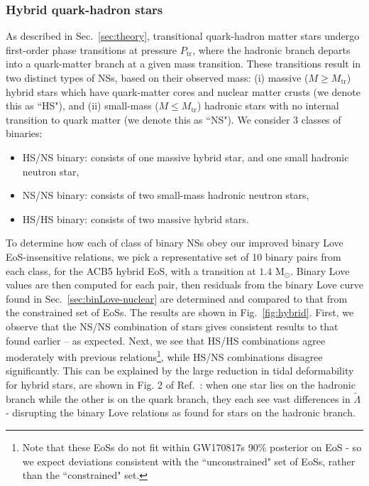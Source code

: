 \documentclass[prd,twocolumn,nofootinbib,superscriptaddress,amsmath,amssymb]{revtex4-1}
\begin{document}
\subsubsection{Hybrid quark-hadron stars}\label{sec:binLove-hybrid}
As described in Sec.~\ref{sec:theory}, transitional quark-hadron matter stars undergo first-order phase transitions at pressure $P_{\text{tr}}$, where the hadronic branch departs into a quark-matter branch at a given mass transition.
These transitions result in two distinct types of NSs, based on their observed mass: (i) massive ($M \geq M_{\text{tr}}$) hybrid stars which have quark-matter cores and nuclear matter crusts (we denote this as ``HS"), and (ii) small-mass ($M \leq M_{\text{tr}}$) hadronic stars with no internal transition to quark matter (we denote this as ``NS").
We consider 3 classes of binaries:
\begin{itemize}
\item HS/NS binary: consists of one massive hybrid star, and one small hadronic neutron star,
\item NS/NS binary: consists of two small-mass hadronic neutron stars,
\item HS/HS binary: consists of two massive hybrid stars.
\end{itemize}

To determine how each of class of binary NSs obey our improved binary Love EoS-insensitive relations, we pick a representative set of 10 binary pairs from each class, for the ACB5 hybrid EoS, with a transition at $1.4 \text{ M}_{\odot}$.
Binary Love values are then computed for each pair, then residuals from the binary Love curve found in Sec.~\ref{sec:binLove-nuclear} are determined and compared to that from the constrained set of EoSs.
The results are shown in Fig.~\ref{fig:hybrid}.
First, we observe that the NS/NS combination of stars gives consistent results to that found earlier -- as expected.
Next, we see that HS/HS combinations agree moderately with previous relations\footnote{Note that these EoSs do not fit within GW170817s 90\% posterior on EoS - so we expect deviations consistent with the ``unconstrained" set of EoSs, rather than the ``constrained" set.}, while HS/NS combinations disagree significantly.
This can be explained by the large reduction in tidal deformability for hybrid stars, are shown in Fig. 2 of Ref.~\cite{Paschalidis2018}: when one star lies on the hadronic branch while the other is on the quark branch, they each see vast differences in $\tilde{\Lambda}$ - disrupting the binary Love relations as found for stars on the hadronic branch.
\end{document}
